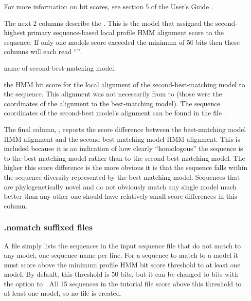 For more information on bit scores, see section 5 of the 
User's Guide \cite{Nawrocki09}. 

The next 2 columns describe the . This is the
model that assigned the second-highest primary sequence-based local 
profile HMM alignment score to the sequence. If only one models score
exceeded the minimum of $50$ bits then these columns will each read
``\prog{-}''.

\begin{wideitem}
\item[\emprog{model name}] name of second-best-matching model.

\item[\emprog{HMM sc}] the HMM bit score for the local alignment of
  the second-best-matching model to the sequence. This alignment was
  not necessarily from  to  (those were the
  coordinates of the alignment to the best-matching model). The
  sequence coordinates of the second-best model's alignment can be
  found in the file .
\end{wideitem}

The final column, , reports the score difference between
the best-matching model HMM alignment and the second-best matching
model HMM alignment. This is included because it is an indication of
how clearly ``homologous'' the sequence is to the best-matching model
rather than to the second-best-matching model. The higher this score
difference is the more obvious it is that the sequence falls within
the sequence diversity represented by the best-matching model.
Sequences that are phylogenetically novel and do not obviously match
any single model much better than any other one should have relatively
small score differences in this column.

\subsubsection{.nomatch suffixed files}

A  file simply lists the sequences in the input
sequence file that do not match to any model, one sequence name per
line. For a sequence to match to a model it must score above the
minimum profile HMM bit score threshold to at least one model. By
default, this threshold is 50 bits, but it can be changed to
 bits with the  option to . All
15 sequences in the tutorial file  score above this
threshold to at least one model, so no  file is
created. 

